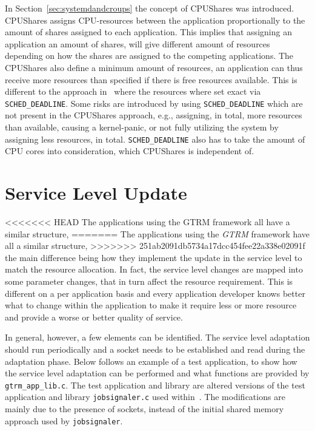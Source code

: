 \documentclass[nobiblatex]{LTHthesis}
\begin{document}
In Section~\ref{sec:systemdandcroups} the concept of CPUShares was introduced. 
CPUShares assigns CPU-resources between the application proportionally to the amount of shares 
assigned to each application. This implies that assigning an application an 
amount of shares, will give different amount of resources depending on how the 
shares are assigned to the competing applications. The CPUShares also define a 
minimum amount of resources, an application can thus receive more resources 
than specified if there is free resources available. This is different to the 
approach in~\cite{gtrm} where the resources where set exact via 
\texttt{SCHED\_DEADLINE}. Some risks are introduced by using 
\texttt{SCHED\_DEADLINE} which are not present in the CPUShares approach, e.g., 
assigning, in total, more resources than available, causing a kernel-panic, 
or not fully utilizing the system by assigning less resources, in total. 
\texttt{SCHED\_DEADLINE} also has to take the amount of CPU cores into 
consideration, which CPUShares is independent of.


\section{Service Level Update}
\label{sec:servicelevelupdatesection}

<<<<<<< HEAD
The applications using the GTRM framework all have a similar structure,
=======
The applications using the \emph{GTRM} framework have all a similar structure,
>>>>>>> 251ab2091db5734a17dcc454fee22a338e02091f
the main difference being how they implement the update in the service
level to match the resource allocation. In fact, the service level changes
are mapped into some parameter changes, that in turn affect the resource
requirement. This is different on a per application basis and every
application developer knows better what to change within the application
to make it require less or more resource and provide a worse or better
quality of service.

In general, however, a few elements can be identified. The service level
adaptation should run periodically and a socket needs to be established
and read during the adaptation phase. Below follows an example of a test application,
 to show how the service level adaptation can be performed
 and what functions are provided by \texttt{gtrm\_app\_lib.c}.
The test application and library are altered versions of the test 
application and library \texttt{jobsignaler.c} used within~\cite{gtrm}.
The modifications are mainly due to the presence of sockets, instead of
the initial shared memory approach used by \texttt{jobsignaler}.
\end{document}
